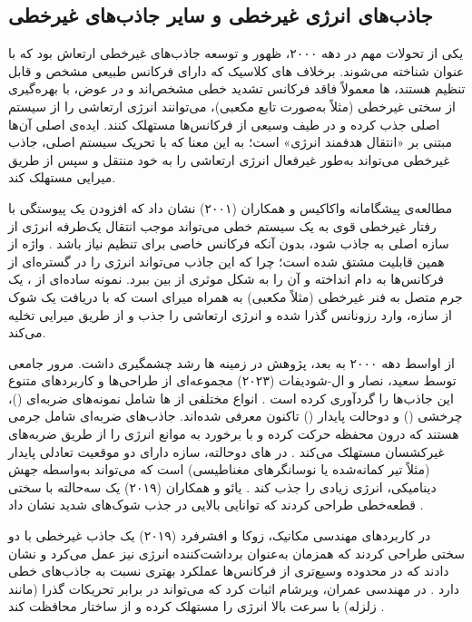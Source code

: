 
\subsection{جاذب‌های انرژی غیرخطی و سایر جاذب‌های غیرخطی}

یکی از تحولات مهم در دهه ۲۰۰۰، ظهور و توسعه جاذب‌های غیرخطی ارتعاش بود که با عنوان  شناخته می‌شوند. برخلاف های کلاسیک که دارای فرکانس طبیعی مشخص و قابل تنظیم هستند، ها معمولاً فاقد فرکانس تشدید خطی مشخص‌اند و در عوض، با بهره‌گیری از سختی غیرخطی (مثلاً به‌صورت تابع مکعبی)، می‌توانند انرژی ارتعاشی را از سیستم اصلی جذب کرده و در طیف وسیعی از فرکانس‌ها مستهلک کنند. ایده‌ی اصلی آن‌ها مبتنی بر «انتقال هدفمند انرژی» است؛ به این معنا که با تحریک سیستم اصلی، جاذب غیرخطی می‌تواند به‌طور غیرفعال انرژی ارتعاشی را به خود منتقل و سپس از طریق میرایی مستهلک کند.

مطالعه‌ی پیشگامانه واکاکیس و همکاران (۲۰۰۱) نشان داد که افزودن یک پیوستگی با رفتار غیرخطی قوی به یک سیستم خطی می‌تواند موجب انتقال یک‌طرفه انرژی از سازه اصلی به جاذب شود، بدون آنکه فرکانس خاصی برای تنظیم نیاز باشد \cite{vakakis2001inducing}. واژه  از همین قابلیت مشتق شده است؛ چرا که این جاذب می‌تواند انرژی را در گستره‌ای از فرکانس‌ها به دام انداخته و آن را به شکل موثری از بین ببرد. نمونه ساده‌ای از ، یک جرم متصل به فنر غیرخطی (مثلاً مکعبی) به همراه میرای است که با دریافت یک شوک از سازه، وارد رزونانس گذرا شده و انرژی ارتعاشی را جذب و از طریق میرایی تخلیه می‌کند.

از اواسط دهه ۲۰۰۰ به بعد، پژوهش در زمینه ها رشد چشمگیری داشت. مرور جامعی توسط سعید، نصار و ال-شودیفات (۲۰۲۳) مجموعه‌ای از طراحی‌ها و کاربردهای متنوع این جاذب‌ها را گردآوری کرده است \cite{saeed2023review}. انواع مختلفی از ها شامل نمونه‌های ضربه‌ای ()، چرخشی () و دو‌حالت پایدار () تاکنون معرفی شده‌اند. جاذب‌های ضربه‌ای شامل جرمی هستند که درون محفظه حرکت کرده و با برخورد به موانع انرژی را از طریق ضربه‌های غیرکشسان مستهلک می‌کند \cite{wang2016numerical, li2025effectiveness, li2024irreversible}. در های دو‌حالته، سازه دارای دو موقعیت تعادلی پایدار (مثلاً تیر کمانه‌شده یا نوسانگرهای مغناطیسی) است که می‌تواند به‌واسطه جهش دینامیکی، انرژی زیادی را جذب کند \cite{yao2020multi, zhang2017piezoelectric, bab2017vibration, jia2020review}. یائو و همکاران (۲۰۱۹) یک  سه‌حالته با سختی قطعه‌خطی طراحی کردند که توانایی بالایی در جذب شوک‌های شدید نشان داد \cite{yao2019tri}.

در کاربردهای مهندسی مکانیک، زوکا و افشرفرد (۲۰۱۹) یک جاذب غیرخطی با دو سختی طراحی کردند که همزمان به‌عنوان برداشت‌کننده انرژی نیز عمل می‌کرد و نشان دادند که در محدوده وسیع‌تری از فرکانس‌ها عملکرد بهتری نسبت به جاذب‌های خطی دارد \cite{zoka2019double}. در مهندسی عمران، ویرشام اثبات کرد که  می‌تواند در برابر تحریکات گذرا (مانند زلزله) با سرعت بالا انرژی را مستهلک کرده و از ساختار محافظت کند \cite{wierschem2014targeted, wierschem2014experimental}.

